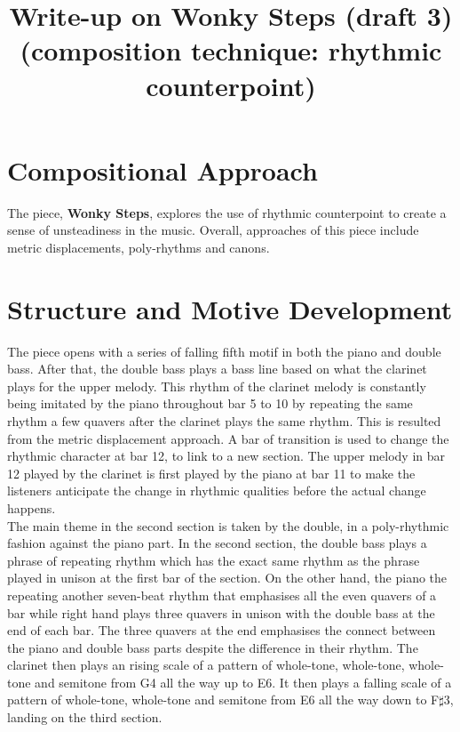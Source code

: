 \documentclass[11pt]{article}
\title{Write-up on \textbf{Wonky Steps} (draft 3)\\
\Large(composition technique: rhythmic counterpoint)}
\author{}
\date
\begin{document}
\maketitle

\section{Compositional Approach}
The piece, \textbf{Wonky Steps}, explores the use of rhythmic counterpoint to create a sense of unsteadiness in the music. Overall, approaches of this piece include metric displacements, poly-rhythms and canons.
\section{Structure and Motive Development}
The piece opens with a series of falling fifth motif in both the piano and double bass. After that, the double bass plays a bass line based on what the clarinet plays for the upper melody. This rhythm of the clarinet melody is constantly being imitated by the piano throughout bar 5 to 10 by repeating the same rhythm a few quavers after the clarinet plays the same rhythm. This is resulted from the metric displacement approach. A bar of transition is used to change the rhythmic character at bar 12, to link to a new section. The upper melody in bar 12 played by the clarinet is first played by the piano at bar 11 to make the listeners anticipate the change in rhythmic qualities before the actual change happens.\\

The main theme in the second section is taken by the double, in a poly-rhythmic fashion against the piano part. In the second section, the double bass plays a phrase of repeating rhythm which has the exact same rhythm as the phrase played in unison at the first bar of the section. On the other hand, the piano the repeating another seven-beat rhythm that emphasises all the even quavers of a bar while right hand plays three quavers in unison with the double bass at the end of each bar. The three quavers at the end emphasises the connect between the piano and double bass parts despite the difference in their rhythm. The clarinet then plays an rising scale of a pattern of whole-tone, whole-tone, whole-tone and semitone from G4 all the way up to E6. It then plays a falling scale of a pattern of whole-tone, whole-tone and semitone from E6 all the way down to F\(\sharp\)3, landing on the third section.\\
\end{document}
